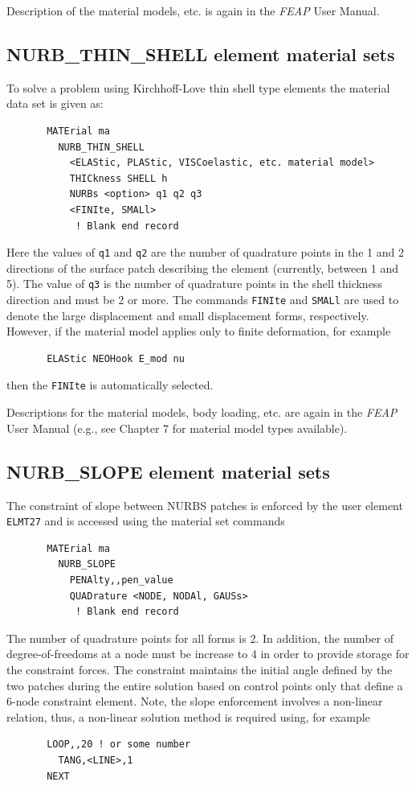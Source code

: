 Description of the material models, etc. is again in the \textsl{FEAP}
User Manual.

\subsection{NURB\_THIN\_SHELL element material sets}

To solve a problem using Kirchhoff-Love thin shell type elements the
material data set is given as:
\begin{verbatim}
       MATErial ma
         NURB_THIN_SHELL
           <ELAStic, PLAStic, VISCoelastic, etc. material model>
           THICkness SHELL h
           NURBs <option> q1 q2 q3
           <FINIte, SMALl>
            ! Blank end record
\end{verbatim}
Here the values of \texttt{q1} and \texttt{q2} are the number of
quadrature points in the 1 and 2 directions of the surface patch
describing the element (currently, between 1 and 5).
The value of \texttt{q3} is the number of
quadrature points in the shell thickness direction and must be 2 or
more.
The commands \texttt{FINIte} and \texttt{SMALl} are used to denote
the large displacement and small displacement forms, respectively.
However, if the material model applies only to finite deformation, for 
example
\begin{verbatim}
       ELAStic NEOHook E_mod nu
\end{verbatim}
then the \texttt{FINIte} is automatically selected.

Descriptions for the material models, body loading, etc. are again in
the \textsl{FEAP} User Manual (e.g., see Chapter 7 for material model
types available).

\subsection{NURB\_SLOPE element material sets}

The constraint of slope between NURBS patches is enforced by the user
element \texttt{ELMT27} and is accessed using the material set commands
\begin{verbatim}
       MATErial ma
         NURB_SLOPE
           PENAlty,,pen_value
           QUADrature <NODE, NODAl, GAUSs>
            ! Blank end record
\end{verbatim}
The number of quadrature points for all forms is 2. 
In addition, the number of degree-of-freedoms at a node must be increase to 4
in order to provide storage for the constraint forces.
The constraint maintains the initial angle defined by the two patches
during the entire solution based on control points only that define
a 6-node constraint element.  Note, the slope enforcement involves a non-linear
relation, thus, a non-linear solution method is required using, for
example
\begin{verbatim}
       LOOP,,20 ! or some number
         TANG,<LINE>,1
       NEXT
\end{verbatim}

